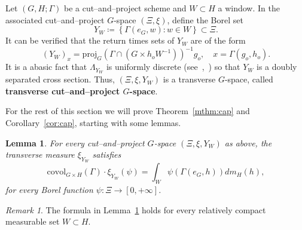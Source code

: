 \documentclass{amsart}
\numberwithin{equation}{subsection}
\newtheorem{lem}[thm]{Lemma}
\theoremstyle{remark}
\newtheorem{rem}[thm]{Remark}
\begin{document}
Let \(\left(G,H;\Gamma\right)\) be a cut--and--project scheme and \(W\subset H\) a window. In the associated cut--and--project \(G\)-space \(\left(\Xi,\xi\right)\), define the Borel set
\[Y_{W}\coloneqq\left\{\Gamma\left(e_{G},w\right):w\in W\right\} \subset\Xi.\]
It can be verified that the return times sets of \(Y_{W}\) are of the form
\[\left(Y_{W}\right)_{x}=\mathrm{proj}_{G}\left(\Gamma\cap\left(G\times h_{o}W^{-1}\right)\right)^{-1}g_{o},\quad x=\Gamma\left(g_{o},h_{o}\right).\]
It is a abasic fact that \(\Lambda_{Y_{W}}\) is uniformly discrete (see~\cite[\S7.1]{BaakeGrimm2013},~\cite[\S2.3]{BjHaAL}) so that \(Y_{W}\) is a doubly separated cross section. Thus, \(\left(\Xi,\xi,Y_{W}\right)\) is a transverse \(G\)-space, called {\bf transverse cut--and--project \(G\)-space}.

For the rest of this section we will prove Theorem~\ref{mthm:cap} and Corollary~\ref{cor:cap}, starting with some lemmas.

\begin{lem}\label{lem:capform}
For every cut--and--project \(G\)-space \(\left(\Xi,\xi,Y_{W}\right)\) as above, the transverse measure \(\xi_{Y_{W}}\) satisfies
\[\mathrm{covol}_{G\times H}\left(\Gamma\right)\cdot\xi_{Y_{W}}\left(\psi\right)=\int_{W}\psi\left(\Gamma\left(e_{G},h\right)\right)dm_{H}\left(h\right),\]
for every Borel function \(\psi:\Xi\to\left[0,+\infty\right]\).
\end{lem}

\begin{rem}
The formula in Lemma~\ref{lem:capform} holds for every relatively compact measurable set \(W\subset H\).
\end{rem}
\end{document}
